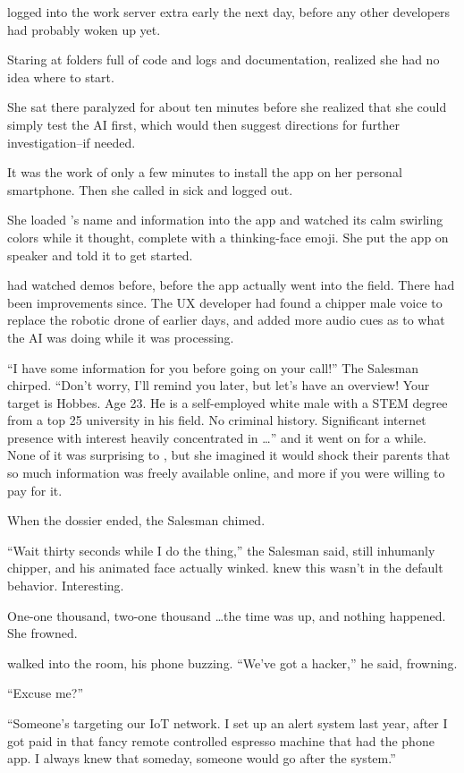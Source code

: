 {\protag} logged into the work server extra early the next day, before any other developers had probably woken up yet.

Staring at folders full of code and logs and documentation, {\protag} realized she had no idea where to start. 

She sat there paralyzed for about ten minutes before she realized that she could simply test the AI first, which would then suggest directions for further investigation--if needed.

It was the work of only a few minutes to install the app on her personal smartphone. Then she called in sick and logged out.

She loaded {\sidetag}'s name and information into the app and watched its calm swirling colors while it thought, complete with a thinking-face emoji. She put the app on speaker and told it to get started.

{\protag} had watched demos before, before the app actually went into the field. There had been improvements since. The UX developer had found a chipper male voice to replace the robotic drone of earlier days, and added more audio cues as to what the AI was doing while it was processing.

``I have some information for you before going on your call!'' The Salesman chirped. ``Don't worry, I'll remind you later, but let's have an overview! Your target is {\sidetag} Hobbes. Age 23. He is a self-employed white male with a STEM degree from a top 25 university in his field. No criminal history. Significant internet presence with interest heavily concentrated in \dots'' and it went on for a while. None of it was surprising to {\protag}, but she imagined it would shock their parents that so much information was freely available online, and more if you were willing to pay for it.

When the dossier ended, the Salesman chimed.

``Wait thirty seconds while I do the thing,'' the Salesman said, still inhumanly chipper, and his animated face actually winked. {\protag} knew this wasn't in the default behavior. Interesting.

One-one thousand, two-one thousand \dots the time was up, and nothing happened. She frowned. 

{\sidetag} walked into the room, his phone buzzing. ``We’ve got a hacker,'' he said, frowning.

``Excuse me?''

``Someone’s targeting our IoT network. I set up an alert system last year, after I got paid in that fancy remote controlled espresso machine that had the phone app. I always knew that someday, someone would go after the system.''


